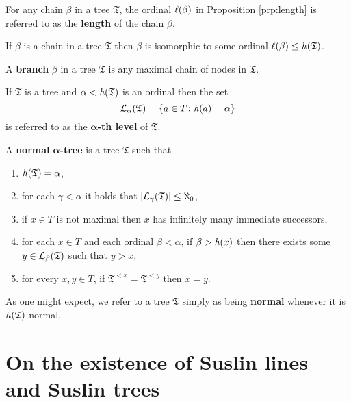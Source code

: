 \begin{dfn}[Length]
	For any chain $\beta$ in a tree $\mathfrak{T}$, the ordinal $\ell(\beta)$ in Proposition \ref{prp:length} is referred to as the \textbf{length} of the chain $\beta$.
\end{dfn}

\begin{prp}\label{prp:length}
	If $\beta$ is a chain in a tree $\mathfrak{T}$ then $\beta$ is isomorphic to some ordinal $\ell(\beta)\leq\mathit{h}(\mathfrak{T})$.
\end{prp}

\begin{dfn}[Branch]
	A \textbf{branch} $\beta$ in a tree $\mathfrak{T}$ is any maximal chain of nodes in $\mathfrak{T}$.
\end{dfn}

\begin{dfn}[Levels]
	If $\mathfrak{T}$ is a tree and $\alpha<\mathit{h}(\mathfrak{T})$ is an ordinal then the set
	\begin{equation}
		\mathcal{L}_{\alpha}(\mathfrak{T})=\lbrace a\in T\colon \mathit{h}(a)=\alpha \rbrace
	\end{equation}
	is referred to as the $\bm{\alpha}$\textbf{-th level} of $\mathfrak{T}$.
\end{dfn}

\begin{dfn}[Normality]
	A \textbf{normal }$\bm{\alpha}$\textbf{-tree} is a tree $\mathfrak{T}$ such that
	\begin{enumerate}
		\item	$\mathit{h}(\mathfrak{T})=\alpha$,
		\item	for each $\gamma<\alpha$ it holds that $\left\lvert\mathcal{L}_{\gamma}(\mathfrak{T})\right\rvert\leq\aleph_0$,
		\item	if $x\in T$ is not maximal then $x$ has infinitely many immediate successors,
		\item	for each $x\in T$ and each ordinal $\beta<\alpha$, if $\beta>\mathit{h}(x)$ then there exists some $y\in\mathcal{L}_{\beta}(\mathfrak{T})$ such that $y>x$,
		\item	for every $x,y\in T$, if $\mathfrak{T}^{<x}=\mathfrak{T}^{<y}$ then $x=y$.
	\end{enumerate}
	As one might expect, we refer to a tree $\mathfrak{T}$ simply as being \textbf{normal} whenever it is $\mathit{h}(\mathfrak{T})$-normal.
\end{dfn}


\section{On the existence of Suslin lines and Suslin trees}

